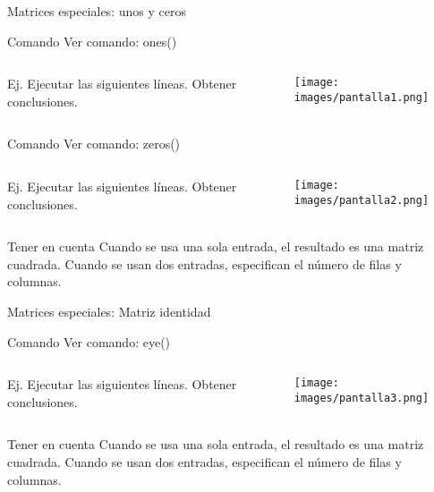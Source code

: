 \documentclass{bredelebeamer}
\begin{document}
\begin{frame}{Matrices especiales: unos y ceros}
\begin{exampleblock}{Comando}
Ver comando: ones()
\end{exampleblock}
\begin{columns}
\begin{column}{0.5\textwidth}
Ej. Ejecutar las siguientes líneas. Obtener conclusiones.
\end{column}
\begin{column}{0.5\textwidth}
\begin{center}
\texttt{[image: images/pantalla1.png]}
\end{center}
\end{column}
\end{columns}
\begin{exampleblock}{Comando}
Ver comando: zeros()
\end{exampleblock}
\begin{columns}
\begin{column}{0.5\textwidth}
Ej. Ejecutar las siguientes líneas. Obtener conclusiones.
\end{column}
\begin{column}{0.5\textwidth}
\begin{center}
\texttt{[image: images/pantalla2.png]}
\end{center}
\end{column}
\end{columns}
\begin{block}{Tener en cuenta}
Cuando se usa una sola entrada, el resultado es una matriz cuadrada. Cuando se usan dos entradas, especifican el número de filas y columnas.
\end{block}
\end{frame}

\begin{frame}{Matrices especiales: Matriz identidad}
\begin{exampleblock}{Comando}
Ver comando: eye()
\end{exampleblock}
\begin{columns}
\begin{column}{0.5\textwidth}
Ej. Ejecutar las siguientes líneas. Obtener conclusiones.
\end{column}
\begin{column}{0.5\textwidth}
\begin{center}
\texttt{[image: images/pantalla3.png]}
\end{center}
\end{column}
\end{columns}
\begin{block}{Tener en cuenta}
Cuando se usa una sola entrada, el resultado es una matriz cuadrada. Cuando se usan dos entradas, especifican el número de filas y columnas.
\end{block}
\end{frame}
\end{document}
